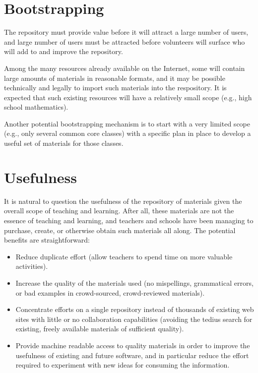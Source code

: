 \section*{Bootstrapping}

The repository must provide value before it will attract a large number
of users, and large number of users must be attracted before volunteers
will surface who will add to and improve the repository.

Among the many resources already available on the Internet, some will
contain large amounts of materials in reasonable formats, and it may be
possible technically and legally to import such materials into the
respository.  It is expected that such existing resources will have a
relatively small scope (e.g., high school mathematics).

Another potential bootstrapping mechanism is to start with a very limited
scope (e.g., only several common core classes) with a specific plan in place
to develop a useful set of materials for those classes.

\section*{Usefulness}

It is natural to question the usefulness of the repository of materials
given the overall scope of teaching and learning.  After all, these materials are
not the essence of teaching and learning, and teachers and schools have
been managing to purchase, create, or otherwise obtain such materials all
along.  The potential benefits are straightforward:

\begin{itemize}
\item Reduce duplicate effort (allow teachers to spend time on more valuable activities).
\item Increase the quality of the materials used (no mispellings, grammatical errors,
or bad examples in crowd-sourced, crowd-reviewed materials).
\item Concentrate efforts on a single repository instead of thousands of
existing web sites with little or no collaboration capabilities (avoiding the
tedius search for existing, freely available materials of sufficient quality).
\item Provide machine readable access to quality materials in order to
improve the usefulness of existing and future software, and in particular
reduce the effort required to experiment with new ideas for consuming the
information.

\end{itemize}

